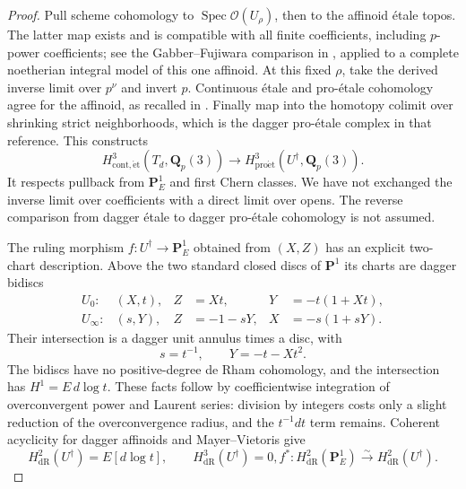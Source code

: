 \documentclass[11pt,a4paper]{amsart}
\numberwithin{equation}{section}
\theoremstyle{definition}
\theoremstyle{remark}
\newcommand{\Q}{\mathbf Q}
\newcommand{\PP}{\mathbf P}
\newcommand{\OO}{\mathcal O}
\newcommand{\Spec}{\operatorname{Spec}}
\begin{document}
\begin{proof}
Pull scheme cohomology to $\Spec\OO(U_\rho)$, then to the affinoid \'etale topos. The latter map exists and is compatible with all finite coefficients, including $p$-power coefficients; see the Gabber--Fujiwara comparison in \cite[Theorem~6.2.1]{Achinger}, applied to a complete noetherian integral model of this one affinoid. At this fixed $\rho$, take the derived inverse limit over $p^\nu$ and invert $p$. Continuous \'etale and pro-\'etale cohomology agree for the affinoid, as recalled in \cite[Section~3.2.3]{ColmezNiziol}. Finally map into the homotopy colimit over shrinking strict neighborhoods, which is the dagger pro-\'etale complex in that reference. This constructs
\begin{equation}\label{d3:eq:schemetodagger}
H^3_{\mathrm{cont},\mathrm{\acute et}}(T_d,\Q_p(3))
\longrightarrow H^3_{\mathrm{pro\acute et}}(U^\dagger,\Q_p(3)).
\end{equation}
It respects pullback from $\PP^1_E$ and first Chern classes. We have not exchanged the inverse limit over coefficients with a direct limit over opens. The reverse comparison from dagger \'etale to dagger pro-\'etale cohomology is not assumed.

The ruling morphism $f:U^\dagger\to\PP^1_E$ obtained from $(X,Z)$ has an explicit two-chart description. Above the two standard closed discs of $\PP^1$ its charts are dagger bidiscs
\begin{align*}
U_0: &(X,t),&Z&=Xt,&Y&=-t(1+Xt),\\
U_\infty: &(s,Y),&Z&=-1-sY,&X&=-s(1+sY).
\end{align*}
Their intersection is a dagger unit annulus times a disc, with
\[
s=t^{-1},\qquad Y=-t-Xt^2.
\]
The bidiscs have no positive-degree de Rham cohomology, and the intersection has $H^1=E\,d\log t$. These facts follow by coefficientwise integration of overconvergent power and Laurent series: division by integers costs only a slight reduction of the overconvergence radius, and the $t^{-1}dt$ term remains. Coherent acyclicity for dagger affinoids \cite[Proposition~3.1]{GrosseKlonne} and Mayer--Vietoris give
\[
H^2_{\mathrm{dR}}(U^\dagger)=E[d\log t],\qquad H^3_{\mathrm{dR}}(U^\dagger)=0,
f^*:H^2_{\mathrm{dR}}(\PP^1_E)\xrightarrow{\sim}H^2_{\mathrm{dR}}(U^\dagger).
\]


\end{proof}
\end{document}
